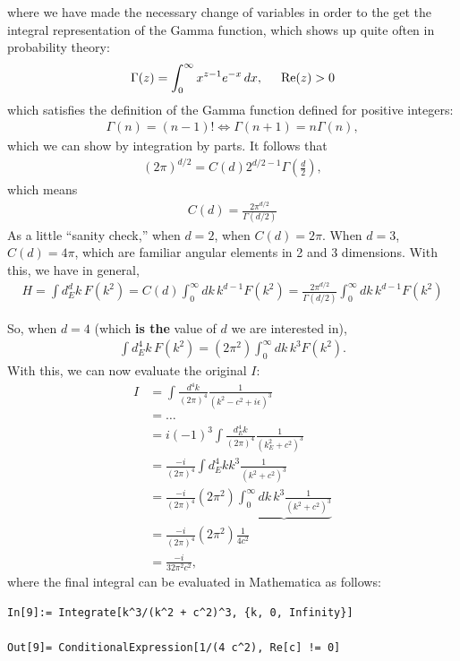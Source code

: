 \documentclass{book}
\theoremstyle{definition}
\newcommand{\f}[2]{\frac{#1}{#2}}
\newcommand{\lp}{\left(}
\newcommand{\rp}{\right)}
\begin{document}
where we have made the necessary change of variables in order to the get the integral representation of the Gamma function, which shows up quite often in probability theory:
\begin{align}
{\Gamma(z) = \int^\infty_0 x^{z-1}e^{-x}\,dx, \hspace{0.5cm} \Re(z) > 0}
\end{align}
which satisfies the definition of the Gamma function defined for positive integers:
\begin{align}
\Gamma(n) = (n-1)! \iff \Gamma(n+1) = n\Gamma(n),
\end{align}
which we can show by integration by parts. It follows that
\begin{align}
\lp 2\pi \rp^{d/2} = C(d) 2^{d/2 - 1} \Gamma\lp \f{d}{2} \rp,
\end{align}
which means 
\begin{align}
\boxed{C(d) = \f{2\pi^{d/2}}{\Gamma\lp d/2 \rp}}
\end{align}
As a little ``sanity check,'' when $d=2$, when $C(d) = 2\pi$. When $d=3$, $C(d) = 4\pi$, which are familiar angular elements in 2 and 3 dimensions. With this, we have in general,
\begin{align}
\boxed{H = \int d^d_E k \,F(k^2) = C(d)\int^\infty_0 dk\, k^{d-1}F(k^2)= \f{2\pi^{d/2}}{\Gamma\lp d/2 \rp}\int^\infty_0 dk\, k^{d-1}F(k^2)}
\end{align}

So, when $d=4$ (which \textbf{is the }value of $d$ we are interested in), 
\begin{align}
\int d^4_E k \, F(k^2) = (2\pi^2) \int^\infty_0 dk\,k^3 F(k^2).
\end{align}
With this, we can now evaluate the original $I$:
\begin{align}
I &= \int \f{d^4k}{(2\pi)^4} \f{1}{(k^2 - c^2+ i\epsilon)^3}\nonumber\\
&= \dots \nonumber\\ 
&= i(-1)^3\int \f{d^4_E k}{(2\pi)^4} \f{1}{(k^2_E + c^2)^3} \nonumber\\
&= \f{-i}{(2\pi)^4}\int d^4_E k k^3 \f{1}{(k^2 + c^2)^3}  \nonumber\\
&= \f{-i}{(2\pi)^4} (2\pi^2) \underbrace{\int^\infty_0 dk\,k^3   \f{1}{(k^2 + c^2)^3}} \nonumber\\
&= \f{-i}{(2\pi)^4} (2\pi^2) \f{1}{4c^2} \nonumber\\
&= {\f{-i}{32 \pi^2 c^2}},
\end{align}
where the final integral can be evaluated in Mathematica as follows:
\begin{lstlisting}
In[9]:= Integrate[k^3/(k^2 + c^2)^3, {k, 0, Infinity}]

Out[9]= ConditionalExpression[1/(4 c^2), Re[c] != 0]
\end{lstlisting}
$\,$\\
\end{document}
